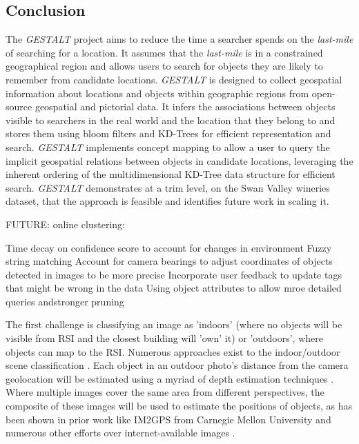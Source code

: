 \subsection{Conclusion}
The \textit{GESTALT} project aims to reduce the time a searcher spends on the \textit{last-mile} of searching for a location. 
It assumes that the \textit{last-mile} is in a constrained geographical region and allows users to search for objects they are likely to remember from candidate locations. 
\textit{GESTALT} is designed to collect geospatial information about locations and objects within geographic regions from open-source geospatial and pictorial data. 
It infers the associations between objects visible to searchers in the real world and the location that they belong to and stores them using bloom filters and KD-Trees for efficient representation and search.
\textit{GESTALT} implements concept mapping to allow a user to query the implicit geospatial relations between objects in candidate locations, leveraging the inherent ordering of the multidimensional KD-Tree data structure for efficient search. 
\textit{GESTALT} demonstrates at a trim level, on the Swan Valley wineries dataset, that the approach is feasible and identifies future work in scaling it.


FUTURE: online clustering: \cite{Montiel2021}

Time decay on confidence score to account for changes in environment
Fuzzy string matching
Account for camera bearings to adjust coordinates of objects detected in images to be more precise
Incorporate user feedback to update tags that might be wrong in the data
Using object attributes to allow mroe detailed queries andstronger pruning



The first challenge is classifying an image as 'indoors' (where no objects will be visible from RSI and the closest building will 'own' it) or 'outdoors', where objects can map to the RSI. Numerous approaches exist to the indoor/outdoor scene classification \cite{Tong2017}. 
Each object in an outdoor photo's distance from the camera geolocation will be estimated using a myriad of depth estimation techniques \cite{Ming2021,Liu2020}. 
Where multiple images cover the same area from different perspectives, the composite of these images will be used to estimate the positions of objects, as has been shown in prior work like IM2GPS from Carnegie Mellon University \cite{Hays2008} and numerous other efforts over internet-available images \cite{Snavely2011}. 